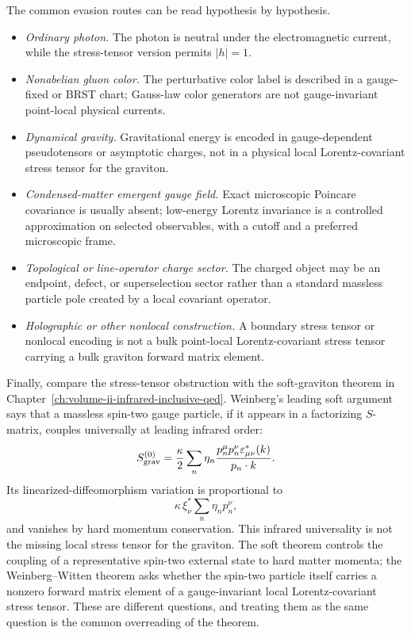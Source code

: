 The common evasion routes can be read hypothesis by hypothesis.
\begin{itemize}[leftmargin=2.0em]
\item \emph{Ordinary photon.}  The photon is neutral under the
  electromagnetic current, while the stress-tensor version permits
  \(|h|=1\).
\item \emph{Nonabelian gluon color.}  The perturbative color label is
  described in a gauge-fixed or BRST chart; Gauss-law color generators are not
  gauge-invariant point-local physical currents.
\item \emph{Dynamical gravity.}  Gravitational energy is encoded in
  gauge-dependent pseudotensors or asymptotic charges, not in a physical local
  Lorentz-covariant stress tensor for the graviton.
\item \emph{Condensed-matter emergent gauge field.}  Exact microscopic
  Poincare covariance is usually absent; low-energy Lorentz invariance is a
  controlled approximation on selected observables, with a cutoff and a
  preferred microscopic frame.
\item \emph{Topological or line-operator charge sector.}  The charged object
  may be an endpoint, defect, or superselection sector rather than a standard
  massless particle pole created by a local covariant operator.
\item \emph{Holographic or other nonlocal construction.}  A boundary stress
  tensor or nonlocal encoding is not a bulk point-local Lorentz-covariant
  stress tensor carrying a bulk graviton forward matrix element.
\end{itemize}

Finally, compare the stress-tensor obstruction with the soft-graviton theorem
in Chapter~\ref{ch:volume-ii-infrared-inclusive-qed}.  Weinberg's leading
soft argument says that a massless spin-two gauge particle, if it appears in a
factorizing \(S\)-matrix, couples universally at leading infrared order:
\[
  S_{\rm grav}^{(0)}
  =
  \frac{\kappa}{2}
  \sum_n\eta_n
  \frac{p_n^\mu p_n^\nu\varepsilon_{\mu\nu}^*(k)}
       {p_n\cdot k}.
\]
Its linearized-diffeomorphism variation is proportional to
\begin{equation}
  \kappa\,\xi_\nu^*\sum_n\eta_n p_n^\nu,
  \label{eq:ww-soft-graviton-ward-check}
\end{equation}
and vanishes by hard momentum conservation.  This infrared universality is
not the missing local stress tensor for the graviton.  The soft theorem
controls the coupling of a representative spin-two external state to hard
matter momenta; the Weinberg--Witten theorem asks whether the spin-two
particle itself carries a nonzero forward matrix element of a
gauge-invariant local Lorentz-covariant stress tensor.  These are different
questions, and treating them as the same question is the common overreading of
the theorem.


